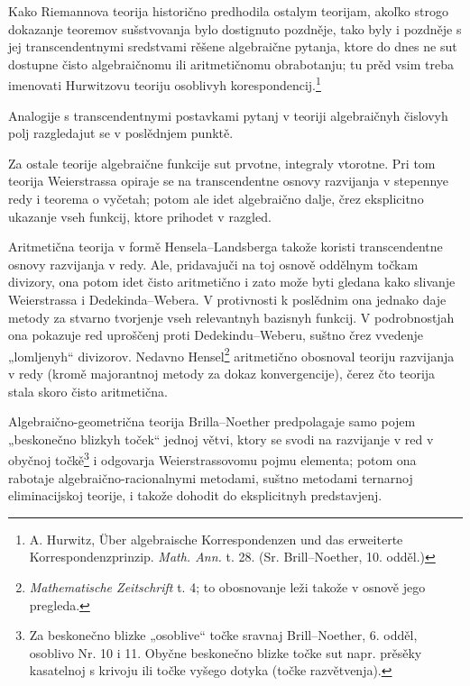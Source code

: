 \documentclass[11pt]{article}
\begin{document}
Kako Riemannova teorija historično predhodila ostalym teorijam, akoľko strogo dokazanje teoremov sušstvovanja bylo dostignuto pozdněje, tako byly i pozdněje s jej transcendentnymi sredstvami rěšene algebraične pytanja, ktore do dnes ne sut dostupne čisto algebraičnomu ili aritmetičnomu obrabotanju; tu prěd vsim treba imenovati Hurwitzovu teoriju osoblivyh korespondencij.\footnote{A. Hurwitz, Über algebraische Korrespondenzen und das erweiterte Korrespondenzprinzip. \emph{Math. Ann.} t. 28. (Sr. Brill--Noether, 10. odděl.)}

Analogije s transcendentnymi postavkami pytanj v teoriji algebraičnyh čislovyh polj razgledajut se v poslědnjem punktě.

Za ostale teorije algebraične funkcije sut prvotne, integraly vtorotne. Pri tom teorija Weierstrassa opiraje se na transcendentne osnovy razvijanja v stepennye redy i teorema o vyčetah; potom ale idet algebraično dalje, črez eksplicitno ukazanje vseh funkcij, ktore prihodet v razgled.

Aritmetična teorija v formě Hensela--Landsberga takože koristi transcendentne osnovy razvijanja v redy. Ale, pridavajuči na toj osnově oddělnym točkam divizory, ona potom idet čisto aritmetično i zato može byti gledana kako slivanje Weierstrassa i Dedekinda--Webera. V protivnosti k poslědnim ona jednako daje metody za stvarno tvorjenje vseh relevantnyh bazisnyh funkcij. V podrobnostjah ona pokazuje red uproščenj proti Dedekindu--Weberu, suštno črez vvedenje „lomljenyh“ divizorov. Nedavno Hensel\footnote{\emph{Mathematische Zeitschrift} t. 4; to obosnovanje leži takože v osnově jego pregleda.} aritmetično obosnoval teoriju razvijanja v redy (kromě majorantnoj metody za dokaz konvergencije), čerez čto teorija stala skoro čisto aritmetična.

Algebraično-geometrična teorija Brilla--Noether predpolagaje samo pojem „beskonečno blizkyh toček“ jednoj větvi, ktory se svodi na razvijanje v red v obyčnoj točkě\footnote{Za beskonečno blizke „osoblive“ točke sravnaj Brill--Noether, 6. odděl, osoblivo Nr. 10 i 11. Obyčne beskonečno blizke točke sut napr. prěsěky kasatelnoj s krivoju ili točke vyšego dotyka (točke razvětvenja).} i odgovarja Weierstrassovomu pojmu elementa; potom ona rabotaje algebraično-racionalnymi metodami, suštno metodami ternarnoj eliminacijskoj teorije, i takože dohodit do eksplicitnyh predstavjenj.
\end{document}
